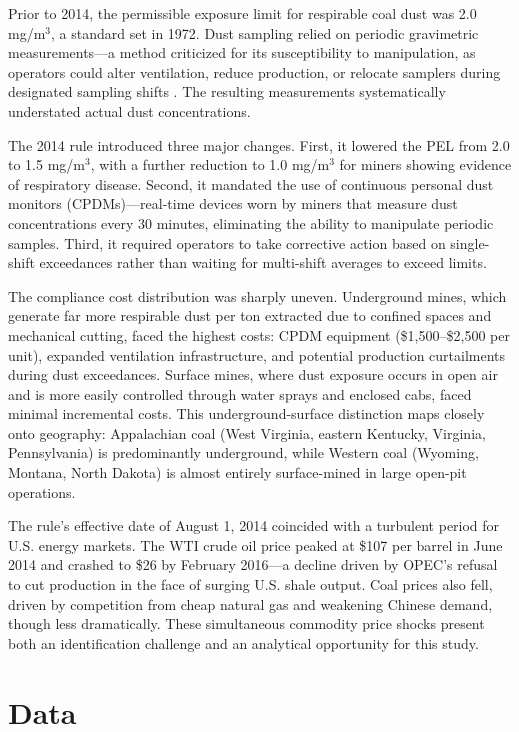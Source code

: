 \documentclass[12pt]{article}
\begin{document}
Prior to 2014, the permissible exposure limit for respirable coal dust was 2.0 mg/m$^3$, a standard set in 1972. Dust sampling relied on periodic gravimetric measurements---a method criticized for its susceptibility to manipulation, as operators could alter ventilation, reduce production, or relocate samplers during designated sampling shifts \citep{laney2012progressive}. The resulting measurements systematically understated actual dust concentrations.

The 2014 rule introduced three major changes. First, it lowered the PEL from 2.0 to 1.5 mg/m$^3$, with a further reduction to 1.0 mg/m$^3$ for miners showing evidence of respiratory disease. Second, it mandated the use of continuous personal dust monitors (CPDMs)---real-time devices worn by miners that measure dust concentrations every 30 minutes, eliminating the ability to manipulate periodic samples. Third, it required operators to take corrective action based on single-shift exceedances rather than waiting for multi-shift averages to exceed limits.

The compliance cost distribution was sharply uneven. Underground mines, which generate far more respirable dust per ton extracted due to confined spaces and mechanical cutting, faced the highest costs: CPDM equipment (\$1,500--\$2,500 per unit), expanded ventilation infrastructure, and potential production curtailments during dust exceedances. Surface mines, where dust exposure occurs in open air and is more easily controlled through water sprays and enclosed cabs, faced minimal incremental costs. This underground-surface distinction maps closely onto geography: Appalachian coal (West Virginia, eastern Kentucky, Virginia, Pennsylvania) is predominantly underground, while Western coal (Wyoming, Montana, North Dakota) is almost entirely surface-mined in large open-pit operations.

The rule's effective date of August 1, 2014 coincided with a turbulent period for U.S. energy markets. The WTI crude oil price peaked at \$107 per barrel in June 2014 and crashed to \$26 by February 2016---a decline driven by OPEC's refusal to cut production in the face of surging U.S. shale output. Coal prices also fell, driven by competition from cheap natural gas and weakening Chinese demand, though less dramatically. These simultaneous commodity price shocks present both an identification challenge and an analytical opportunity for this study.


\section{Data}
\label{sec:data}
\end{document}

